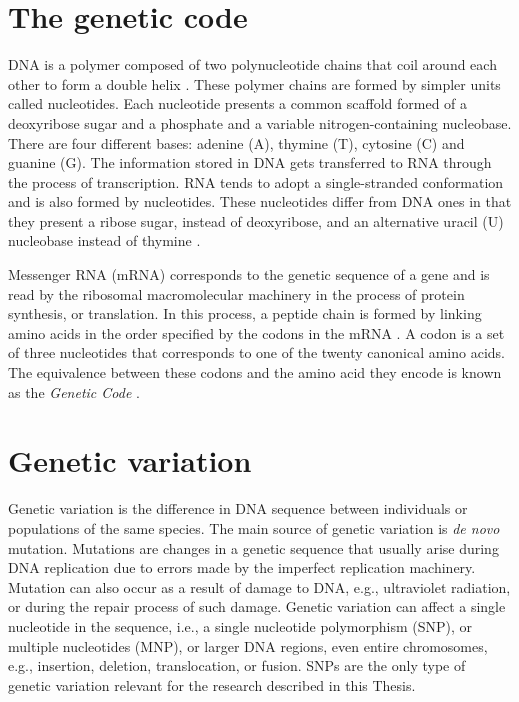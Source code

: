 \section{The genetic code}

DNA is a polymer composed of two polynucleotide chains that coil around each other to form a double helix \cite{WATSON_1953_DNA}. These polymer chains are formed by simpler units called nucleotides. Each nucleotide presents a common scaffold formed of a deoxyribose sugar and a phosphate and a variable nitrogen-containing nucleobase. There are four different bases: adenine (A), thymine (T), cytosine (C) and guanine (G). The information stored in DNA gets transferred to RNA through the process of transcription. RNA tends to adopt a single-stranded conformation and is also formed by nucleotides. These nucleotides differ from DNA ones in that they present a ribose sugar, instead of deoxyribose, and an alternative uracil (U) nucleobase instead of thymine \cite{LEVENE_1909_NUCLEICS}.

Messenger RNA (mRNA) corresponds to the genetic sequence of a gene and is read by the ribosomal macromolecular machinery in the process of protein synthesis, or translation. In this process, a peptide chain is formed by linking amino acids in the order specified by the codons in the mRNA \cite{CRICK_1957_CODE}. A codon is a set of three nucleotides that corresponds to one of the twenty canonical amino acids. The equivalence between these codons and the amino acid they encode is known as the \textit{Genetic Code} \cite{GAMOW_1954_CODE}.

\section{Genetic variation}

Genetic variation is the difference in DNA sequence between individuals or populations of the same species. The main source of genetic variation is \textit{de novo} mutation. Mutations are changes in a genetic sequence that usually arise during DNA replication due to errors made by the imperfect replication machinery. Mutation can also occur as a result of damage to DNA, e.g., ultraviolet radiation, or during the repair process of such damage. Genetic variation can affect a single nucleotide in the sequence, i.e., a single nucleotide polymorphism (SNP), or multiple nucleotides (MNP), or larger DNA regions, even entire chromosomes, e.g., insertion, deletion, translocation, or fusion. SNPs are the only type of genetic variation relevant for the research described in this Thesis.

